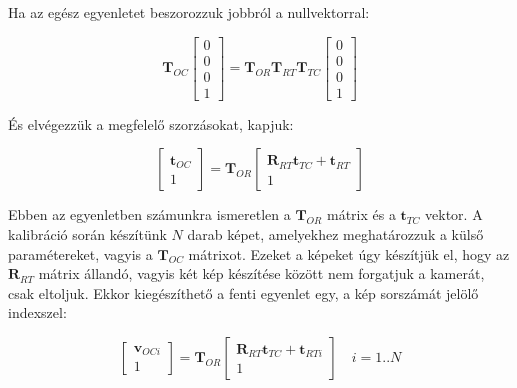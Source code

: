 	Ha az egész egyenletet beszorozzuk jobbról a nullvektorral:
	
	\begin{equation}
	\mathbf{T}_{OC}\left[ \begin{array}{c} 0 \\ 0 \\ 0 \\ 1 \end{array}	 \right] = \mathbf{T}_{OR}\mathbf{T}_{RT}\mathbf{T}_{TC}\left[ \begin{array}{c} 0 \\ 0 \\ 0 \\ 1 \end{array}	\right]
	\end{equation}	
		
	És elvégezzük a megfelelő szorzásokat, kapjuk:
	
	\begin{equation}
	\left[
	\begin{array}{c}
		\mathbf{t}_{OC}\\
		1
	\end{array}
	\right]	
	 = \mathbf{T}_{OR} 
	 \left[
	\begin{array}{c}
	\mathbf{R}_{RT}\mathbf{t}_{TC} + \mathbf{t}_{RT} \\ 1
	\end{array}	
	 \right]
	\end{equation}
	
	Ebben az egyenletben számunkra ismeretlen a $\mathbf{T}_{OR}$ mátrix és a $\mathbf{t}_{TC}$ vektor. A kalibráció során készítünk $N$ darab képet, amelyekhez meghatározzuk a külső paramétereket, vagyis a $\mathbf{T}_{OC}$ mátrixot. Ezeket a képeket úgy készítjük el, hogy az $\mathbf{R}_{RT}$ mátrix állandó, vagyis két kép készítése között nem forgatjuk a kamerát, csak eltoljuk. Ekkor kiegészíthető a fenti egyenlet egy, a kép sorszámát jelölő indexszel:
	
	\begin{equation}
	\label{eq:rot-est}
	\left[
	\begin{array}{c}
		\mathbf{v}_{OCi}\\
		1
	\end{array}
	\right]	
	 = \mathbf{T}_{OR} 
	 \left[
	\begin{array}{c}
	\mathbf{R}_{RT}\mathbf{t}_{TC} + \mathbf{t}_{RTi} \\ 1
	\end{array}	
	 \right] \quad i = 1..N
	\end{equation}
	
